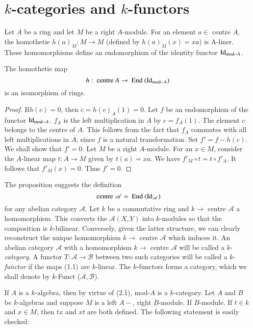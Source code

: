 \section{$k$-categories and $k$-functors} %

Let $A$ be a ring and let $M$ be a right $A$-module. For an element $a
\in $ centre $A$, the homothetie $h(a)_M: M \to M$ (defined by
$h(a)_M (x) = xa$) is A-liner. These homomorphisms define an
endomorphism of the identity functor $\operatorname{Id}_{{\rm mod}-A}$.  

\begin{prop}\label{chap2:prop2.1}%
The homothetie map 
$$
h : \text{ centre } A \to \text{ End } (\operatorname{Id}_{{\rm mod} - A})   
$$
is an isomorphism of rings.
\end{prop}

\begin{proof}
If\pageoriginale $h(c) = 0 $, then $c = h (c)_A (1) = 0 $. Let $f$ be an
endomorphism of the functor $\operatorname{Id}_{{\rm mod} - A}$. $f_A$ is the left
multiplication in $A$ by $c = f_A (1)$. The element $c$ belongs to the
centre of $A$. This follows from the fact that $f_A$ commutes with all
left multiplications in $A$, since $f$ is a natural
transformation. Set $f' = f - h(c)$. We shall show that $f' = 0$. Let
$M$ be a right $A$-module. For an $x \in M$, consider the $A$-linear map
$t : A \to M$ given by $t(a) = xa$. We have $f'_M \circ t = t \circ f'_A$. It
follows that $f'_M(x) = 0 $. Thus $f' = 0 $.  
\end{proof}

The proposition suggests the definition 
$$
\text{ centre }\mathscr{A} = \text{ End } (\operatorname{Id}_{\mathscr{A}})  
$$
for any abelian category $\mathscr{A}$. Let $k$ be a commutative ring
and $k \to$ centre $\mathscr{A}$ a homomorphism. This converts
the $\mathscr{A}(X, Y)$ into $k$-modules so that the composition is
$k$-bilinear. Conversely, given the latter structure, we can clearly
reconstruct the unique homomorphism $k \to \text{ centre }\mathscr{A}$
which induces it. An abelian category $\mathscr{A}$ with a
homomorphism $k \to \text{ centre }\mathscr{A}$ will be called a $k$-
\textit{category}. A functor $T : \mathscr{A} \to \mathscr{B}$ between
two such categories will be called a $k$-\textit{functor} if the maps
(1.1) are $k$-linear. The $k$-functors forms a category, which we shall
denote by $k$-Funct ($\mathscr{A}, \mathscr{B}$).  

If $A$ is a $k$-algebra, then by virtue of (2.1), mod-$A$ is a
$k$-category. Let $A$ and $B$ be $k$-algebras and suppose $M$ is a left
$A-$, right $B$-module. If $B$-module. If $t \in k$ and $x \in M$, then
$tx$ and $xt$ are both defined. The following statement is easily
checked:


